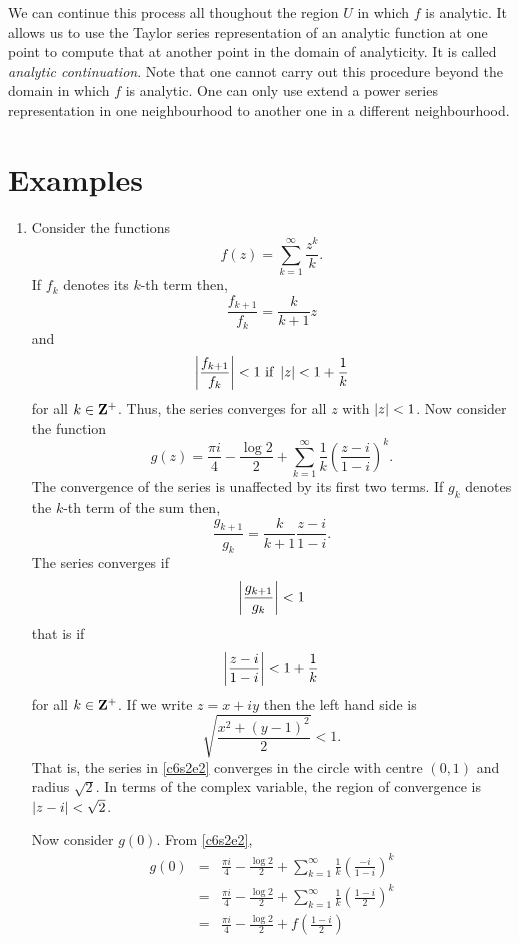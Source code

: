 We can continue this process all thoughout the region $U$ in which $f$ is analytic.
It allows us to use the Taylor series representation of an analytic function at
one point to compute that at another point in the domain of analyticity. It is 
called \emph{analytic continuation}. Note that one cannot carry out this procedure
beyond the domain in which $f$ is analytic. One can only use extend a power series
representation in one neighbourhood to another one in a different neighbourhood.

\section{Examples}\label{c6s2}
\begin{enumerate}
\item Consider the functions \cite{spiegel1964schaum}
\begin{equation}\label{c6s2e1}
f(z) = \sum_{k=1}^\infty \frac{z^k}{k}.
\end{equation}
If $f_k$ denotes its $k$-th term then,
\[
\frac{f_{k+1}}{f_k} = \frac{k}{k+1}z
\]
and 
\[
\left\vert{\frac{f_{k+1}}{f_k}}\right\vert < 1 \text{ if } \left\vert{z}\right\vert < 1 + \frac{1}{k}
\]
for all $k \in \mathbf{Z}^+$. Thus, the series converges for all $z$ with $\left\vert{z}\right\vert < 1$.
Now consider the function
\begin{equation}\label{c6s2e2}
g(z) = \frac{\pi i}{4} - \frac{\log 2}{2} + 
\sum_{k=1}^\infty \frac{1}{k}\left(\frac{z-i}{1-i}\right)^k.
\end{equation}
The convergence of the series is unaffected by its first two terms. If $g_k$ denotes 
the $k$-th term of the sum then,
\[
\frac{g_{k+1}}{g_k} = \frac{k}{k+1}\frac{z-i}{1-i}.
\]
The series converges if
\[
\left\vert{\frac{g_{k+1}}{g_k}}\right\vert < 1
\] 
that is if
\[
\left\vert{\frac{z-i}{1-i}}\right\vert < 1 + \frac{1}{k}
\]
for all $k \in \mathbf{Z}^+$. If we write $z = x + iy$ then the left hand side is
\[
\sqrt{\frac{x^2 + (y - 1)^2}{2}} < 1.
\]
That is, the series in \eqref{c6s2e2} converges in the circle with centre $(0, 1)$
and radius $\sqrt{2}$. In terms of the complex variable, the region of convergence
is $\left\vert{z - i}\right\vert < \sqrt{2}$.

Now consider $g(0)$. From \eqref{c6s2e2},
\begin{eqnarray*}
g(0) &=& \frac{\pi i}{4} - \frac{\log 2}{2} + 
\sum_{k=1}^\infty \frac{1}{k}\left(\frac{-i}{1-i}\right)^k \\
 &=& \frac{\pi i}{4} - \frac{\log 2}{2} + 
\sum_{k=1}^\infty \frac{1}{k}\left(\frac{1-i}{2}\right)^k \\
 &=& \frac{\pi i}{4} - \frac{\log 2}{2} + f\left(\frac{1-i}{2}\right)
\end{eqnarray*}


\end{enumerate}
